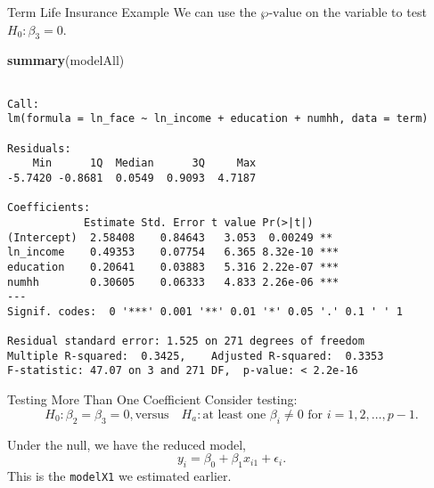 \documentclass[
  ignorenonframetext,
]{beamer}
\newenvironment{Shaded}{\begin{snugshade}}{\end{snugshade}}
\newcommand{\FunctionTok}[1]{\textcolor[rgb]{0.13,0.29,0.53}{\textbf{#1}}}
\newcommand{\NormalTok}[1]{#1}
\begin{document}
\begin{frame}[fragile]{Term Life Insurance Example}
\protect\hypertarget{term-life-insurance-example-3}{}
We can use the \(\wp\text{-value}\) on the variable to test
\(H_0:\beta_3=0\).

\scriptsize

\begin{Shaded}
\begin{Highlighting}[]
\FunctionTok{summary}\NormalTok{(modelAll)}
\end{Highlighting}
\end{Shaded}

\begin{verbatim}

Call:
lm(formula = ln_face ~ ln_income + education + numhh, data = term)

Residuals:
    Min      1Q  Median      3Q     Max 
-5.7420 -0.8681  0.0549  0.9093  4.7187 

Coefficients:
            Estimate Std. Error t value Pr(>|t|)    
(Intercept)  2.58408    0.84643   3.053  0.00249 ** 
ln_income    0.49353    0.07754   6.365 8.32e-10 ***
education    0.20641    0.03883   5.316 2.22e-07 ***
numhh        0.30605    0.06333   4.833 2.26e-06 ***
---
Signif. codes:  0 '***' 0.001 '**' 0.01 '*' 0.05 '.' 0.1 ' ' 1

Residual standard error: 1.525 on 271 degrees of freedom
Multiple R-squared:  0.3425,    Adjusted R-squared:  0.3353 
F-statistic: 47.07 on 3 and 271 DF,  p-value: < 2.2e-16
\end{verbatim}

\normalsize
\end{frame}

\begin{frame}[fragile]{Testing More Than One Coefficient}
\protect\hypertarget{testing-more-than-one-coefficient}{}
Consider testing:
\[H_0:\beta_2=\beta_3=0, \text{versus} \quad H_a: \text{at least one } \beta_i \neq 0 \text{ for } i = 1, 2, \ldots, p-1.\]

Under the null, we have the reduced model,
\[y_i=\beta_0+\beta_1 x_{i1}+\epsilon_i.\] This is the \texttt{modelX1}
we estimated earlier.
\end{frame}
\end{document}
